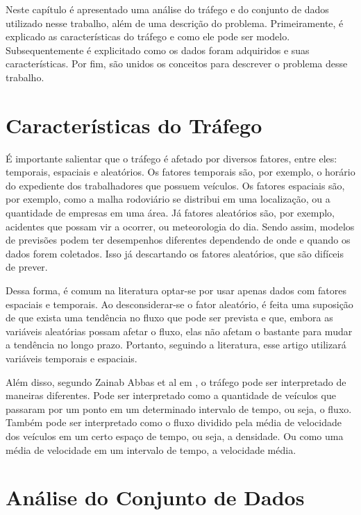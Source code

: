 Neste capítulo é apresentado uma análise do tráfego e do conjunto de dados utilizado nesse trabalho, além de uma descrição do problema. Primeiramente, é explicado as características do tráfego e como ele pode ser modelo. Subsequentemente é explicitado como os dados foram adquiridos e suas características. Por fim, são unidos os conceitos para descrever o problema desse trabalho.

\section{Características do Tráfego}

É importante salientar que o tráfego é afetado por diversos fatores, entre eles: temporais, espaciais e aleatórios. Os fatores temporais são, por exemplo, o horário do expediente dos trabalhadores que possuem veículos. Os fatores espaciais são, por exemplo, como a malha rodoviário se distribui em uma localização, ou a quantidade de empresas em uma área. Já fatores aleatórios são, por exemplo, acidentes que possam vir a ocorrer, ou meteorologia do dia. Sendo assim, modelos de previsões podem ter desempenhos diferentes dependendo de onde e quando os dados forem coletados. Isso já descartando os fatores aleatórios, que são difíceis de prever.

Dessa forma, é comum na literatura optar-se por usar apenas dados com fatores espaciais e temporais. Ao desconsiderar-se o fator aleatório, é feita uma suposição de que exista uma tendência no fluxo que pode ser prevista e que, embora as variáveis aleatórias possam afetar o fluxo, elas não afetam o bastante para mudar a tendência no longo prazo. Portanto, seguindo a literatura, esse artigo utilizará variáveis temporais e espaciais.

Além disso, segundo Zainab Abbas et al em \cite{Zainab_2018}, o tráfego pode ser interpretado de maneiras diferentes. Pode ser interpretado como a quantidade de veículos que passaram por um ponto em um determinado intervalo de tempo, ou seja, o fluxo. Também pode ser interpretado como o fluxo dividido pela média de velocidade dos veículos em um certo espaço de tempo, ou seja, a densidade. Ou como uma média de velocidade em um intervalo de tempo, a velocidade média.

\section{Análise do Conjunto de Dados}

